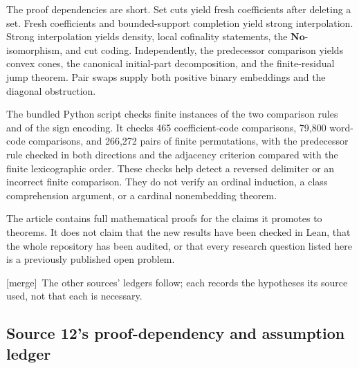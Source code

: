 \documentclass[11pt]{article}
\theoremstyle{definition}
\theoremstyle{remark}
\newcommand{\No}{\mathbf{No}}
\newcommand{\merge}{\textsf{[merge]}}
\begin{document}
The proof dependencies are short. Set cuts yield fresh
coefficients after deleting a set. Fresh coefficients and
bounded-support completion yield strong interpolation.
Strong interpolation yields density, local cofinality
statements, the \(\No\)-isomorphism, and cut coding.
Independently, the predecessor comparison yields convex
cones, the canonical initial-part decomposition, and the
finite-residual jump theorem. Pair swaps supply both
positive binary embeddings and the diagonal obstruction.

The bundled Python script checks finite instances of
the two comparison rules and of the sign encoding. It
checks 465 coefficient-code comparisons, 79,800
word-code comparisons, and 266,272 pairs of finite
permutations, with the predecessor rule checked in both
directions and the adjacency criterion compared with the
finite lexicographic order. These checks help detect a
reversed delimiter or an incorrect finite comparison.
They do not verify an ordinal induction, a class
comprehension argument, or a cardinal nonembedding
theorem.

The article contains full mathematical proofs for the
claims it promotes to theorems. It does not claim that
the new results have been checked in Lean, that the
whole repository has been audited, or that every
research question listed here is a previously published
open problem.


\merge\ The other sources' ledgers follow; each records the hypotheses its
source used, not that each is necessary.

\subsection{Source 12's proof-dependency and assumption ledger}
\end{document}
